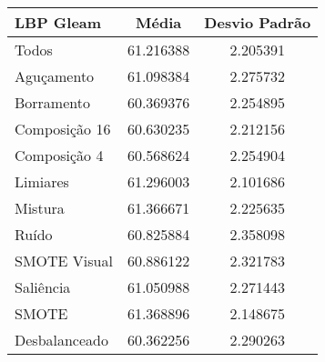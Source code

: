 \begin{table}[!htbp]
\centering
\caption{}
\label{tab:resultados:x:melhor}
\begin{tabular}{|l|c|c|}
\hline
\textbf{LBP Gleam} & \textbf{Média}     & \textbf{Desvio Padrão} \\ \hline
   Todos        &  61.216388 &  2.205391  \\ \hline
  Aguçamento    &  61.098384 &  2.275732  \\ \hline
  Borramento    &  60.369376 &  2.254895  \\ \hline
  Composição 16 &  60.630235 &  2.212156  \\ \hline
  Composição 4  &  60.568624 &  2.254904  \\ \hline
  Limiares      &  61.296003 &  2.101686  \\ \hline
  Mistura       &  61.366671 &  2.225635  \\ \hline
  Ruído         &  60.825884 &  2.358098  \\ \hline
  SMOTE Visual  &  60.886122 &  2.321783  \\ \hline
  Saliência     &  61.050988 &  2.271443  \\ \hline
 SMOTE          &  61.368896 &  2.148675  \\ \hline
Desbalanceado   &  60.362256 &  2.290263  \\ \hline
\end{tabular}
\end{table}


